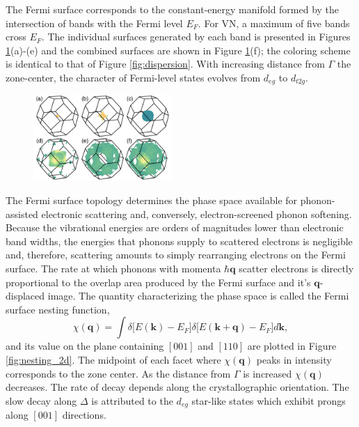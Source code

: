 \documentclass[twocolumn,showpacs,preprintnumbers,superscriptaddress,prb,floatfix,aps,10pt]{revtex4-1}
\renewcommand{\vec}[1]{\ensuremath{\mathbf{#1}}}
\newcommand*{\nesting}{\chi(\vec{q})}
\begin{document}
The Fermi surface corresponds to the constant-energy manifold formed by the intersection of bands with the Fermi level $E_F$. For VN, a maximum of five bands cross $E_F$. The individual surfaces generated by each band is presented in Figures \ref{fig:fermi_surface}(a)-(e) and the combined surfaces are shown in Figure \ref{fig:fermi_surface}(f); the coloring scheme is identical to that of Figure \ref{fig:dispersion}. With increasing distance from $\Gamma$ the zone-center, the character of Fermi-level states evolves from $d_{eg}$ to $d_{t2g}$. 
%
\begin{figure}[h]
\includegraphics[width=0.47\textwidth]{Figure_2_fermi_surface.png}
\caption[LRC circuit response.]{\label{fig:fermi_surface} }
\end{figure}

The Fermi surface topology determines the phase space available for phonon-assisted electronic scattering and, conversely, electron-screened phonon softening. Because the vibrational energies are orders of magnitudes lower than electronic band widths, the energies that phonons supply to scattered electrons is negligible and, therefore, scattering amounts to simply rearranging electrons on the Fermi surface. The rate at which phonons with momenta $\hbar\vec{q}$ scatter electrons is directly proportional to the overlap area produced by the Fermi surface and it's $\vec{q}$-displaced image. The quantity characterizing the phase space is called the Fermi surface nesting function, 
%
\begin{equation}
\label{eq:nesting}
\nesting = \int \delta\big[ E(\vec{k}) - E_F \big] \delta\big[ E(\vec{k + q}) - E_F \big] d\vec{k},
\end{equation}
%
and its value on the plane containing $\mathrm{[001]}$ and $\mathrm{[110]}$ are plotted in Figure \ref{fig:nesting_2d}. The midpoint of each facet where $\nesting$ peaks in intensity corresponds to the zone center. As the distance from $\Gamma$ is increased $\nesting$ decreases. The rate of decay depends along the crystallographic orientation. The slow decay along $\Delta$ is attributed to the $d_{eg}$ star-like states which exhibit prongs along $\mathrm{[001]}$ directions. 
\end{document}
